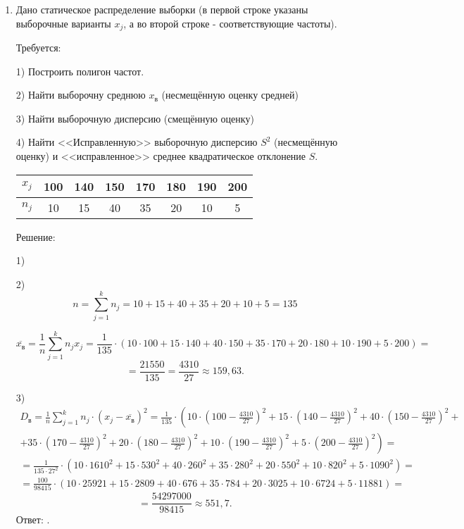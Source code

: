 \documentclass{article}
\begin{document}
\begin{enumerate}
\item %
Дано статическое распределение выборки (в первой строке указаны выборочные варианты $x_j$, а во второй строке - соответствующие частоты).

Требуется:

1) Построить полигон частот.

2) Найти выборочну среднюю $x_\textit{в}$ (несмещённую оценку средней)

3) Найти выборочную дисперсию (смещённую оценку)

4) Найти <<Исправленную>> выборочную дисперсию $S^2$ (несмещённую оценку) и <<исправленное>> среднее квадратическое отклонение $S$.

\begin{center}
\begin{tabular}{|c|c|c|c|c|c|c|c|}
\hline
$x_j$ & 100 & 140 & 150 & 170 & 180 & 190 & 200 \\
\hline
$n_j$ & 10 & 15 & 40 & 35 & 20 & 10 & 5 \\
\hline
\end{tabular}
\end{center}
\begin{center}Решение:\end{center}
1)

2) $$n=\sum_{j=1}^k n_j=10+15+40+35+20+10+5=135$$

$$\overline{x_\textit{в}}=\frac{1}{n}\sum_{j=1}^k n_j x_j=\frac{1}{135}\cdot\left(10\cdot100+15\cdot140+40\cdot150+35\cdot170+20\cdot180+10\cdot190+5\cdot200\right)=$$
$$=\frac{21550}{135}=\frac{4310}{27}\approx159,63.$$

3)
\begin{multline*}
D_{\textit{в}}=\frac{1}{n}\sum_{j=1}^k n_j
\cdot\left(x_j-\overline{x_\textit{в}}\right)^2=
\frac{1}{135}\cdot\left(10\cdot\left(100-\frac{4310}{27}\right)^2+15\cdot\left(140-\frac{4310}{27}\right)^2+40\cdot\left(150-\frac{4310}{27}\right)^2+\right.\\
+\left.35\cdot\left(170-\frac{4310}{27}\right)^2+20\cdot\left(180-\frac{4310}{27}\right)^2+10\cdot\left(190-\frac{4310}{27}\right)^2+5\cdot\left(200-\frac{4310}{27}\right)^2\right)=\\
=\frac{1}{135\cdot27^2}\cdot\left(10\cdot1610^2+15\cdot530^2+40\cdot260^2+35\cdot280^2+20\cdot550^2+10\cdot820^2+5\cdot1090^2\right)=\\
=\frac{100}{98415}\cdot\left(10\cdot25921+15\cdot2809+40\cdot676+35\cdot784+20\cdot3025+10\cdot6724+5\cdot11881\right)=
\end{multline*}
$$=\frac{54297000}{98415}\approx551,7.$$
Ответ: $ $.


\end{enumerate}
\end{document}
